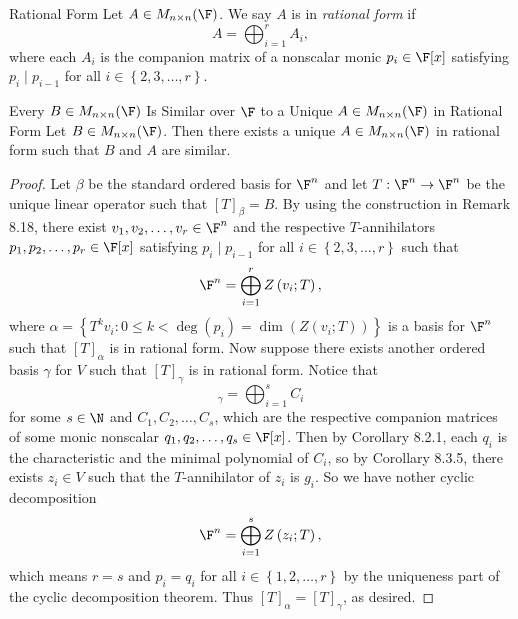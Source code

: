 \documentclass[linearalgebra]{subfiles}
\begin{document}
    \begin{definition}{Rational Form}{}
        Let $A\in M_{n\times n}(\F)$. We say $A$ is in \emph{rational form} if
        \begin{equation*}
            A = \bigoplus^{r}_{i=1} A_i,
        \end{equation*}
        where each $A_i$ is the companion matrix of a nonscalar monic $p_i\in\F[x]$ satisfying $p_i\mid p_{i-1}$ for all $i\in\left\lbrace 2,3,\ldots,r \right\rbrace $.
    \end{definition}

    \begin{theorem}{Every $B\in M_{n\times n}(\F)$ Is Similar over $\F$ to a Unique $A\in M_{n\times n}(\F)$ in Rational Form}
        Let $B\in M_{n\times n}(\F)$. Then there exists a unique $A\in M_{n\times n}(\F)$ in rational form such that $B$ and $A$ are similar.
    \end{theorem}

    \begin{proof}
        Let $\beta$ be the standard ordered basis for $\F^n$ and let $T:\F^n\to\F^n$ be the unique linear operator such that $[T]_\beta = B$. By using the construction in Remark 8.18, there exist $v_1,v_2,\ldots,v_r\in\F^n$ and the respective $T$-annihilators $p_1,p_2,\ldots,p_r\in\F[x]$ satisfying $p_i\mid p_{i-1}$ for all $i\in \left\lbrace 2,3,\ldots,r \right\rbrace$ such that
        \begin{equation*}
            \F^n = \bigoplus^{r}_{i=1} Z\left( v_i;T \right) ,
        \end{equation*}
        where $\alpha = \left\lbrace T^kv_i:0\leq k< \deg\left( p_i \right) = \dim\left( Z\left( v_i;T \right)  \right)  \right\rbrace$ is a basis for $\F^n$ such that $[T]_\alpha$ is in rational form. Now suppose there exists another ordered basis $\gamma$ for $V$ such that $[T]_\gamma$ is in rational form. Notice that
        \begin{equation*}
            [T]_\gamma = \bigoplus^{s}_{i=1} C_i
        \end{equation*}
        for some $s\in\N$ and $C_1,C_2, \ldots, C_s$, which are the respective companion matrices of some monic nonscalar $q_1,q_2,\ldots,q_s\in\F[x]$. Then by Corollary 8.2.1, each $q_i$ is the characteristic and the minimal polynomial of $C_i$, so by Corollary 8.3.5, there exists $z_i\in V$ such that the $T$-annihilator of $z_i$ is $g_i$. So we have nother cyclic decomposition
        \begin{equation*}
            \F^n = \bigoplus^{s}_{i=1} Z\left( z_i;T \right) ,
        \end{equation*}
        which means $r=s$ and $p_i=q_i$ for all $i\in \left\lbrace 1,2,\ldots,r \right\rbrace$ by the uniqueness part of the cyclic decomposition theorem. Thus $[T]_\alpha = [T]_\gamma$, as desired.
    \end{proof}
\end{document}
